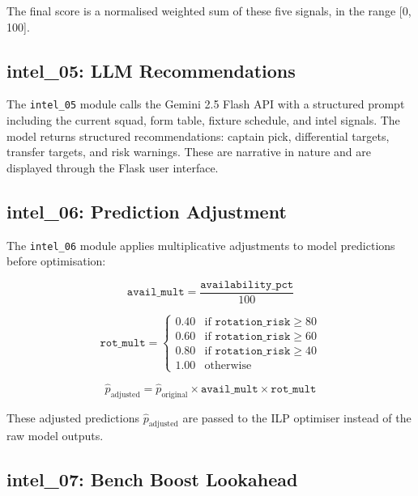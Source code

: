 The final score is a normalised weighted sum of these five signals, in the range [0, 100].

\subsection{intel\_05: LLM Recommendations}

The \texttt{intel\_05} module calls the Gemini 2.5 Flash API with a structured prompt including the current squad, form table, fixture schedule, and intel signals. The model returns structured recommendations: captain pick, differential targets, transfer targets, and risk warnings. These are narrative in nature and are displayed through the Flask user interface.

\subsection{intel\_06: Prediction Adjustment}

The \texttt{intel\_06} module applies multiplicative adjustments to model predictions before optimisation:

\begin{equation}
\texttt{avail\_mult} = \frac{\texttt{availability\_pct}}{100}
\end{equation}

\begin{equation}
\texttt{rot\_mult} = \begin{cases}
0.40 & \text{if } \texttt{rotation\_risk} \geq 80 \\
0.60 & \text{if } \texttt{rotation\_risk} \geq 60 \\
0.80 & \text{if } \texttt{rotation\_risk} \geq 40 \\
1.00 & \text{otherwise}
\end{cases}
\end{equation}

\begin{equation}
\hat{p}_{\text{adjusted}} = \hat{p}_{\text{original}} \times \texttt{avail\_mult} \times \texttt{rot\_mult}
\end{equation}

These adjusted predictions $\hat{p}_{\text{adjusted}}$ are passed to the ILP optimiser instead of the raw model outputs.

\subsection{intel\_07: Bench Boost Lookahead}

